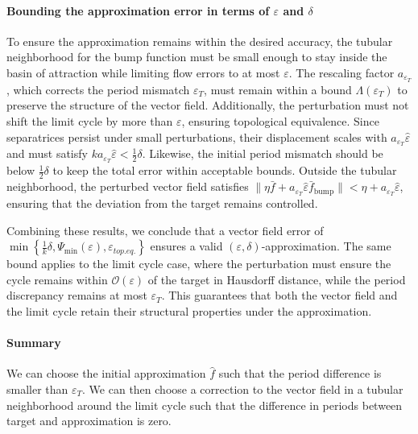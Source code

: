 \documentclass{article}
\theoremstyle{definition} \newtheorem{definition}{Definition}
\theoremstyle{remark} \newtheorem{remark}{Remark}
\newcounter{ct}
\begin{document}
\paragraph{Bounding the approximation error in terms of $\varepsilon$ and $\delta$}  

To ensure the approximation remains within the desired accuracy, the tubular neighborhood for the bump function must be small enough to stay inside the basin of attraction while limiting flow errors to at most $\varepsilon$. The rescaling factor $a_{\varepsilon_T}$, which corrects the period mismatch $\varepsilon_T$, must remain within a bound $\Lambda(\varepsilon_T)$ to preserve the structure of the vector field. Additionally, the perturbation must not shift the limit cycle by more than $\varepsilon$, ensuring topological equivalence.
 Since separatrices persist under small perturbations, their displacement scales with $a_{\varepsilon_T} \hat{\varepsilon}$ and must satisfy $k a_{\varepsilon_T} \hat{\varepsilon} < \frac{1}{2} \delta$.
  Likewise, the initial period mismatch should be below $\frac{1}{2} \delta$ to keep the total error within acceptable bounds.
  Outside the tubular neighborhood, the perturbed vector field satisfies $\| \eta \bar{f} + a_{\varepsilon_T} \hat{\varepsilon} \bar{f}_{\operatorname{bump}} \| < \eta + a_{\varepsilon_T} \hat{\varepsilon}$, ensuring that the deviation from the target remains controlled.  

Combining these results, we conclude that a vector field error of $\min \left\{ \frac{1}{k} \delta, \Psi_{\min}(\varepsilon), \varepsilon_{top.eq.} \right\}$ ensures a valid $(\varepsilon, \delta)$-approximation.
 The same bound applies to the limit cycle case, where the perturbation must ensure the cycle remains within $\mathcal{O}(\varepsilon)$ of the target in Hausdorff distance, while the period discrepancy remains at most $\varepsilon_T$.
 This guarantees that both the vector field and the limit cycle retain their structural properties under the approximation.  



\paragraph{Summary}
We can choose the initial approximation $\hat{f}$ such that the period difference is smaller than $\varepsilon_T$.
We can then choose a correction to the vector field in a tubular neighborhood around the limit cycle such that the difference in periods between target and approximation is zero.
\end{document}
